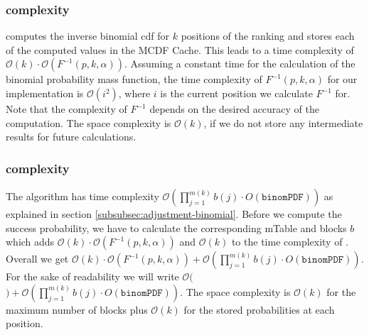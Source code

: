 \subsubsection{\algoMtable complexity}\label{subsubsec:construct-mtable-complexity}
\algoMtable computes the inverse binomial cdf for $k$ positions of the ranking and stores each of the computed values in the MCDF Cache.
%
This leads to a time complexity of $\mathcal{O}(k) \cdot \mathcal{O}(F^{-1}(p,k,\alpha))$.
%
Assuming a constant time for the calculation of the binomial probability mass function, the time complexity of $F^{-1}(p,k,\alpha)$ for our implementation is $\mathcal{O}(i^2)$, where $i$ is the current position we calculate $F^{-1}$ for.
%
Note that the complexity of $F^{-1}$ depends on the desired accuracy of the computation.
%
The space complexity is $\mathcal{O}(k)$, if we do not store any intermediate results for future calculations.
%
\begin{table}[b!]
	\vspace{2mm}
	\caption{Time complexity for all algorithms for one protected group without pre-computed results.\label{tbl:time-space-binom}}
\end{table}

\subsubsection{\algoRecursive complexity}\label{subsubsec:success-prob-complexity}
The algorithm \algoRecursive has time complexity $\mathcal{O}(\prod_{j=1}^{m(k)}b(j) \cdot O(\texttt{binomPDF}))$ as explained in section \ref{subsubsec:adjustment-binomial}.
%
Before we compute the success probability, we have to calculate the corresponding mTable and blocks $b$ which adds $\mathcal{O}(k) \cdot \mathcal{O}(F^{-1}(p,k,\alpha))$ and $\mathcal{O}(k)$ to the time complexity of \algoRecursive.
%
Overall we get $\mathcal{O}(k) \cdot \mathcal{O}(F^{-1}(p,k,\alpha)) + \mathcal{O}(\prod_{j=1}^{m(k)}b(j) \cdot O(\texttt{binomPDF}))$.
%
For the sake of readability we will write $\mathcal{O}($\algoMtable$) + \mathcal{O}(\prod_{j=1}^{m(k)}b(j) \cdot O(\texttt{binomPDF}))$.
%
The space complexity is $\mathcal{O}(k)$ for the maximum number of blocks plus $\mathcal{O}(k)$ for the stored probabilities at each position.
%
